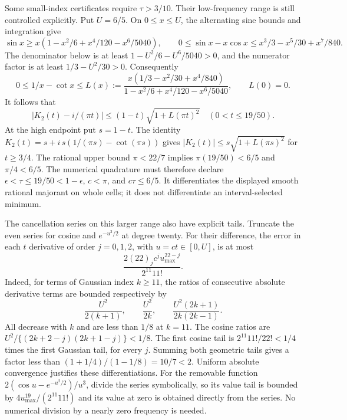 Some small-index certificates require $\tau>3/10$. Their low-frequency
range is still controlled explicitly. Put $U=6/5$. On $0\le x\le U$,
the alternating sine bounds and integration give
\[
 \sin x\ge x\left(1-x^2/6+x^4/120-x^6/5040\right),\qquad
 0\le\sin x-x\cos x\le x^3/3-x^5/30+x^7/840.
\]
The denominator below is at least $1-U^2/6-U^6/5040>0$, and the
numerator factor is at least $1/3-U^2/30>0$. Consequently
\[
 0\le1/x-\cot x\le L(x):=
 \frac{x(1/3-x^2/30+x^4/840)}
      {1-x^2/6+x^4/120-x^6/5040},
 \qquad L(0)=0.
\]
It follows that
\[
 |K_2(t)-i/(\pi t)|
 \le(1-t)\sqrt{1+L(\pi t)^2}
 \quad(0<t\le19/50).
\]
At the high endpoint put $s=1-t$. The identity
$K_2(t)=s+i\,s(1/(\pi s)-\cot(\pi s))$ gives
$|K_2(t)|\le s\sqrt{1+L(\pi s)^2}$ for $t\ge3/4$.
The rational upper bound $\pi<22/7$ implies
$\pi(19/50)<6/5$ and $\pi/4<6/5$.
The numerical quadrature must therefore declare
$\epsilon<\tau\le19/50<1-\epsilon$, $c<\pi$, and $c\tau\le6/5$.
It differentiates the displayed smooth rational majorant on whole cells;
it does not differentiate an interval-selected minimum.

The cancellation series on this larger range also have explicit tails.
Truncate the even series for cosine and $e^{-u^2/2}$ at degree twenty.
For their difference, the error in each $t$ derivative of order
$j=0,1,2$, with $u=ct\in[0,U]$, is at most
\[
 \frac{2(22)_j c^j u_{\max}^{22-j}}{2^{11}11!}.
\]
Indeed, for terms of Gaussian index $k\ge11$, the ratios of consecutive
absolute derivative terms are bounded respectively by
\[
 \frac{U^2}{2(k+1)},\qquad \frac{U^2}{2k},\qquad
 \frac{U^2(2k+1)}{2k(2k-1)}.
\]
All decrease with $k$ and are less than $1/8$ at $k=11$.
The cosine ratios are
$U^2/\{(2k+2-j)(2k+1-j)\}<1/8$.
The first cosine tail is $2^{11}11!/22!<1/4$ times the first Gaussian
tail, for every $j$. Summing both geometric tails gives a factor less
than $(1+1/4)/(1-1/8)=10/7<2$.
Uniform absolute convergence justifies these differentiations.
For the removable function $2(\cos u-e^{-u^2/2})/u^3$, divide the series
symbolically, so its value tail is bounded by
$4u_{\max}^{19}/(2^{11}11!)$ and its value at zero is obtained directly
from the series. No numerical division by a nearly zero frequency is
needed.

